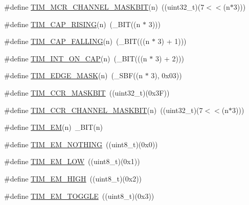 \begin{DoxyCompactItemize}
\item 
\#define \hyperlink{group___t_i_m___private___macros_ga2eb868a6985c03e000ac2178e90ced69}{\-T\-I\-M\-\_\-\-M\-C\-R\-\_\-\-C\-H\-A\-N\-N\-E\-L\-\_\-\-M\-A\-S\-K\-B\-I\-T}(n)~((uint32\-\_\-t)(7$<$$<$(n$\ast$3)))
\item 
\#define \hyperlink{group___t_i_m___private___macros_gab6cafe744c33d993fb73a2d760ca7340}{\-T\-I\-M\-\_\-\-C\-A\-P\-\_\-\-R\-I\-S\-I\-N\-G}(n)~(\-\_\-\-B\-I\-T((n $\ast$ 3)))
\item 
\#define \hyperlink{group___t_i_m___private___macros_gadff38292221f4e050784ad5c05a7d42b}{\-T\-I\-M\-\_\-\-C\-A\-P\-\_\-\-F\-A\-L\-L\-I\-N\-G}(n)~(\-\_\-\-B\-I\-T(((n $\ast$ 3) + 1)))
\item 
\#define \hyperlink{group___t_i_m___private___macros_ga158cc44f24d73a5da467135b7858a59c}{\-T\-I\-M\-\_\-\-I\-N\-T\-\_\-\-O\-N\-\_\-\-C\-A\-P}(n)~(\-\_\-\-B\-I\-T(((n $\ast$ 3) + 2)))
\item 
\#define \hyperlink{group___t_i_m___private___macros_ga1ad2e808075aefd42807823b02d9ff4d}{\-T\-I\-M\-\_\-\-E\-D\-G\-E\-\_\-\-M\-A\-S\-K}(n)~(\-\_\-\-S\-B\-F((n $\ast$ 3), 0x03))
\item 
\#define \hyperlink{group___t_i_m___private___macros_gaac3958647e0dab177737b05b5ec87436}{\-T\-I\-M\-\_\-\-C\-C\-R\-\_\-\-M\-A\-S\-K\-B\-I\-T}~((uint32\-\_\-t)(0x3\-F))
\item 
\#define \hyperlink{group___t_i_m___private___macros_ga7ecc0b7fb80e5490594f29366a91003a}{\-T\-I\-M\-\_\-\-C\-C\-R\-\_\-\-C\-H\-A\-N\-N\-E\-L\-\_\-\-M\-A\-S\-K\-B\-I\-T}(n)~((uint32\-\_\-t)(7$<$$<$(n$\ast$3)))
\item 
\#define \hyperlink{group___t_i_m___private___macros_gad9dc2c8c417f61caf0cff78375883e2f}{\-T\-I\-M\-\_\-\-E\-M}(n)~\-\_\-\-B\-I\-T(n)
\item 
\#define \hyperlink{group___t_i_m___private___macros_ga24f85cb089df52c9f41cb66e5856f6a8}{\-T\-I\-M\-\_\-\-E\-M\-\_\-\-N\-O\-T\-H\-I\-N\-G}~((uint8\-\_\-t)(0x0))
\item 
\#define \hyperlink{group___t_i_m___private___macros_ga2aba5cc8ab9f5d6077857ee4393e1c21}{\-T\-I\-M\-\_\-\-E\-M\-\_\-\-L\-O\-W}~((uint8\-\_\-t)(0x1))
\item 
\#define \hyperlink{group___t_i_m___private___macros_gaf3fc16c9a7476be8be7040176246e871}{\-T\-I\-M\-\_\-\-E\-M\-\_\-\-H\-I\-G\-H}~((uint8\-\_\-t)(0x2))
\item 
\#define \hyperlink{group___t_i_m___private___macros_gae22d1eaef16a185e599c9c2f1c3cb0e9}{\-T\-I\-M\-\_\-\-E\-M\-\_\-\-T\-O\-G\-G\-L\-E}~((uint8\-\_\-t)(0x3))

\end{DoxyCompactItemize}
